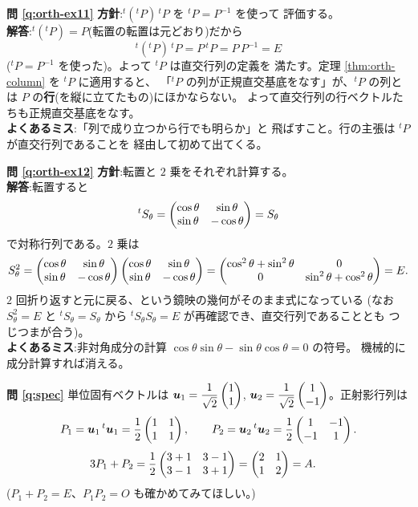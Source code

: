 \bigskip
\noindent\textbf{問 \ref{q:orth-ex11}}\quad
\textbf{方針}:${}^t({}^t\!P)\,{}^t\!P$ を ${}^t\!P = P^{-1}$ を使って
評価する。\\
\textbf{解答}:${}^t({}^t\!P) = P$(転置の転置は元どおり)だから
\[
{}^t({}^t\!P)\,{}^t\!P = P\,{}^t\!P = P\,P^{-1} = E
\]
(${}^t\!P = P^{-1}$ を使った)。よって ${}^t\!P$ は直交行列の定義を
満たす。定理 \ref{thm:orth-column} を ${}^t\!P$ に適用すると、
「${}^t\!P$ の列が正規直交基底をなす」が、${}^t\!P$ の列とは
$P$ の\textbf{行}(を縦に立てたもの)にほかならない。
よって直交行列の行ベクトルたちも正規直交基底をなす。\\
\textbf{よくあるミス}:「列で成り立つから行でも明らか」と
飛ばすこと。行の主張は ${}^t\!P$ が直交行列であることを
経由して初めて出てくる。

\bigskip
\noindent\textbf{問 \ref{q:orth-ex12}}\quad
\textbf{方針}:転置と $2$ 乗をそれぞれ計算する。\\
\textbf{解答}:転置すると
\[
{}^t S_\theta = \begin{pmatrix}\cos\theta & \sin\theta \\ \sin\theta & -\cos\theta\end{pmatrix}
= S_\theta
\]
で対称行列である。$2$ 乗は
\[
S_\theta^2 = \begin{pmatrix}\cos\theta & \sin\theta \\ \sin\theta & -\cos\theta\end{pmatrix}
\begin{pmatrix}\cos\theta & \sin\theta \\ \sin\theta & -\cos\theta\end{pmatrix}
= \begin{pmatrix}\cos^2\theta + \sin^2\theta & 0 \\ 0 & \sin^2\theta + \cos^2\theta\end{pmatrix} = E.
\]
$2$ 回折り返すと元に戻る、という鏡映の幾何がそのまま式になっている
(なお $S_\theta^2 = E$ と ${}^tS_\theta = S_\theta$ から
${}^tS_\theta S_\theta = E$ が再確認でき、直交行列であることとも
つじつまが合う)。\\
\textbf{よくあるミス}:非対角成分の計算
$\cos\theta\sin\theta - \sin\theta\cos\theta = 0$ の符号。
機械的に成分計算すれば消える。

\bigskip
\noindent\textbf{問 \ref{q:spec}}\quad
単位固有ベクトルは
$\bm{u}_1 = \dfrac{1}{\sqrt{2}}\begin{pmatrix}1 \\ 1\end{pmatrix}$,
$\bm{u}_2 = \dfrac{1}{\sqrt{2}}\begin{pmatrix}1 \\ -1\end{pmatrix}$。正射影行列は
\[
P_1 = \bm{u}_1\,{}^t\bm{u}_1 = \frac{1}{2}\begin{pmatrix}1 & 1 \\ 1 & 1\end{pmatrix},
\qquad
P_2 = \bm{u}_2\,{}^t\bm{u}_2 = \frac{1}{2}\begin{pmatrix}1 & -1 \\ -1 & 1\end{pmatrix}.
\]
\[
3P_1 + P_2 = \frac{1}{2}\begin{pmatrix}3 + 1 & 3 - 1 \\ 3 - 1 & 3 + 1\end{pmatrix}
= \begin{pmatrix}2 & 1 \\ 1 & 2\end{pmatrix} = A. \quad
\]
($P_1 + P_2 = E$、$P_1 P_2 = O$ も確かめてみてほしい。)

